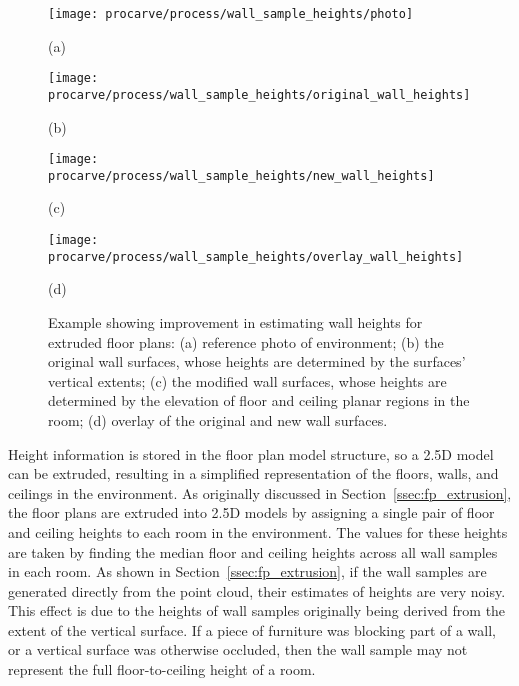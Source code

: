\documentclass[12pt,onecolumn,oneside]{book}
\begin{document}
\begin{figure}

	\centering
	\begin{minipage}[t]{0.45\linewidth}
		\centerline{\texttt{[image: procarve/process/wall\_sample\_heights/photo]}}
		\centerline{(a)}
	\end{minipage}
	\hfill
	\begin{minipage}[t]{0.45\linewidth}
		\centerline{\texttt{[image: procarve/process/wall\_sample\_heights/original\_wall\_heights]}}
		\centerline{(b)}
	\end{minipage}
	
	\begin{minipage}[t]{0.45\linewidth}
		\centerline{\texttt{[image: procarve/process/wall\_sample\_heights/new\_wall\_heights]}}
		\centerline{(c)}
	\end{minipage}
	\hfill
	\begin{minipage}[t]{0.45\linewidth}
		\centerline{\texttt{[image: procarve/process/wall\_sample\_heights/overlay\_wall\_heights]}}
		\centerline{(d)}
	\end{minipage}

	\caption[Comparison of wall extrusion methods.]{Example showing improvement in estimating wall heights for extruded floor plans: (a) reference photo of environment; (b) the original wall surfaces, whose heights are determined by the surfaces' vertical extents; (c) the modified wall surfaces, whose heights are determined by the elevation of floor and ceiling planar regions in the room; (d) overlay of the original and new wall surfaces.}
	\label{fig:octree_wall_sample_heights}
\end{figure}

Height information is stored in the floor plan model structure, so a 2.5D model can be extruded, resulting in a simplified representation of the floors, walls, and ceilings in the environment.  As originally discussed in Section~\ref{ssec:fp_extrusion}, the floor plans are extruded into 2.5D models by assigning a single pair of floor and ceiling heights to each room in the environment.  The values for these heights are taken by finding the median floor and ceiling heights across all wall samples in each room.  As shown in Section~\ref{ssec:fp_extrusion}, if the wall samples are generated directly from the point cloud, their estimates of heights are very noisy.  This effect is due to the heights of wall samples originally being derived from the extent of the vertical surface.  If a piece of furniture was blocking part of a wall, or a vertical surface was otherwise occluded, then the wall sample may not represent the full floor-to-ceiling height of a room.  
\end{document}
